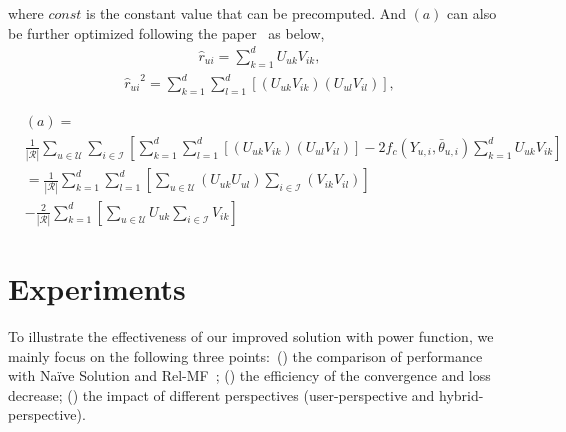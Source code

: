 \documentclass[sigconf]{acmart}
\begin{document}
where $const$ is the constant value that can be precomputed. And $(a)$ can also be further optimized following the paper~\cite{chen2019efficient} as below,
\begin{eqnarray}\label{eq:r_ui}
{\hat{r}_{ui}} = \sum_{k = 1}^{d} U_{uk} V_{ik} ,
\end{eqnarray}
\begin{eqnarray}\label{eq:r_ui^2}
{\hat{r}_{ui}}^2 = \sum_{k = 1}^{d} \sum_{l = 1}^{d} \left[ \left(U_{uk} V_{ik}\right)  \left(U_{ul} V_{il}\right) \right],
\end{eqnarray}

\begin{equation}\label{eq:complexityProofRemoveConst}
\begin{split}
 &(a) =  \\
 & \frac{1}{|\mathcal{R}|} \sum_{u \in \mathcal{U}}^{} \sum_{i \in \mathcal{I}}^{} \left[ \sum_{k = 1}^{d} \sum_{l = 1}^{d} \left[ \left(U_{uk} V_{ik}\right)  \left(U_{ul} V_{il}\right) \right] - 2f_{c}({Y_{u,i}}, {\bar{\theta}_{u,i}}) \sum_{k = 1}^{d} U_{uk} V_{ik}  \right]  \\ 
 &=  \frac{1}{|\mathcal{R}|} \sum_{k = 1}^{d} \sum_{l = 1}^{d} \left[\sum_{u \in \mathcal{U}}^{} \left(U_{uk} U_{ul}\right) \sum_{i \in \mathcal{I}}^{} \left(V_{ik} V_{il}\right)  \right] \\
 & -   \frac{2}{|\mathcal{R}|} \sum_{k = 1}^{d} \left[\sum_{u \in \mathcal{U}}^{}  U_{uk} \sum_{i \in \mathcal{I}}^{} V_{ik}  \right]
\end{split}
\end{equation} 
\section{Experiments}
\label{sec:exp}
To illustrate the effectiveness of our improved solution with power function, we mainly focus on the following three points$\colon$ () the comparison of performance with Na\"ive Solution and Rel-MF~\cite{saito2020unbiased}; () the efficiency of the convergence and loss decrease; () the impact of different perspectives (user-perspective and hybrid-perspective). 
\end{document}
